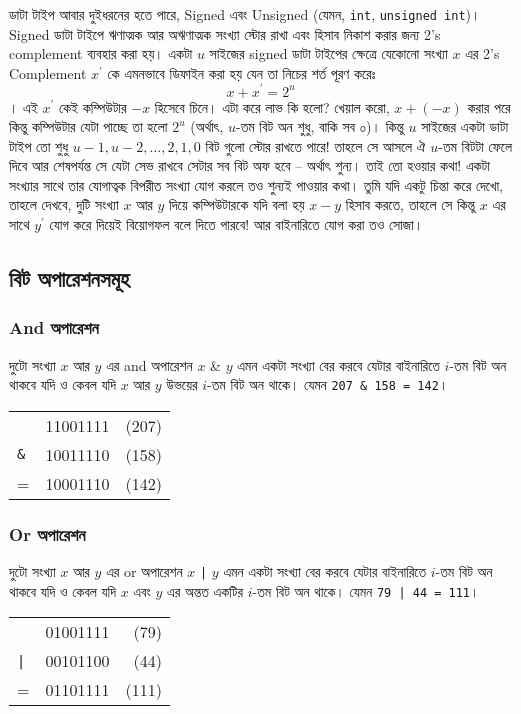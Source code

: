 ডাটা টাইপ আবার দুইধরনের হতে পারে, Signed এবং Unsigned (যেমন, \texttt{int}, \texttt{unsigned int})। Signed ডাটা টাইপে ঋণাত্মক আর অঋণাত্মক সংখ্যা স্টোর রাখা এবং হিসাব নিকাশ করার জন্য 2's complement ব্যবহার করা হয়। একটা $u$ সাইজের signed ডাটা টাইপের ক্ষেত্রে যেকোনো সংখ্যা $x$ এর 2's Complement $x^{\prime}$ কে এমনভাবে ডিফাইন করা হয় যেন তা নিচের শর্ত পূরণ করেঃ $$x + x^\prime = 2^u$$। এই $x^\prime$ কেই কম্পিউটার $-x$ হিসেবে চিনে। এটা করে লাভ কি হলো? খেয়াল করো, $x + (-x)$ করার পরে কিন্তু কম্পিউটার যেটা পাচ্ছে তা হলো $2^u$ (অর্থাৎ, $u$-তম বিট অন শুধু, বাকি সব ০)। কিন্তু $u$ সাইজের একটা ডাটা টাইপ তো শুধু $u-1, u-2, \ldots, 2, 1, 0$ বিট গুলো স্টোর রাখতে পারে! তাহলে সে আসলে ঐ $u$-তম বিটটা ফেলে দিবে আর শেষপর্যন্ত সে যেটা সেভ রাখবে সেটার সব বিট অফ হবে -- অর্থাৎ শুন্য। তাই তো হওয়ার কথা! একটা সংখ্যার সাথে তার যোগাত্বক বিপরীত সংখ্যা যোগ করলে তও শুন্যই পাওয়ার কথা। তুমি যদি একটু চিন্তা করে দেখো, তাহলে দেখবে, দুটি সংখ্যা $x$ আর $y$ দিয়ে কম্পিউটারকে যদি বলা হয় $x-y$ হিসাব করতে, তাহলে সে কিন্তু $x$ এর সাথে $y^\prime$ যোগ করে দিয়েই বিয়োগফল বলে দিতে পারবে! আর বাইনারিতে যোগ করা তও সোজা।

\subsection{বিট অপারেশনসমূহ}

\subsubsection{And অপারেশন}
দুটো সংখ্যা $x$ আর $y$ এর and অপারেশন $x$ \& $y$ এমন একটা সংখ্যা বের করবে যেটার বাইনারিতে $i$-তম বিট অন থাকবে যদি ও কেবল যদি $x$ আর $y$ উভয়ের $i$-তম বিট অন থাকে। যেমন \texttt{207 \& 158 = 142}।
\begin{center}
\begin{tabular}{llr}
  & 11001111 & (207)\\
  \texttt{\&} & 10011110 & (158)\\
  \hline
  = & 10001110 & (142)
\end{tabular}
\end{center}

\subsubsection{Or অপারেশন}
দুটো সংখ্যা $x$ আর $y$ এর or অপারেশন $x$ \texttt{|} $y$ এমন একটা সংখ্যা বের করবে যেটার বাইনারিতে $i$-তম বিট অন থাকবে যদি ও কেবল যদি $x$ এবং $y$ এর অন্তত একটির $i$-তম বিট অন থাকে। যেমন \texttt{79 | 44 = 111}।
\begin{center}
\begin{tabular}{llr}
  & 01001111 & (79)\\
  \texttt{|} & 00101100 & (44)\\
  \hline
  = & 01101111 & (111)
\end{tabular}
\end{center}


